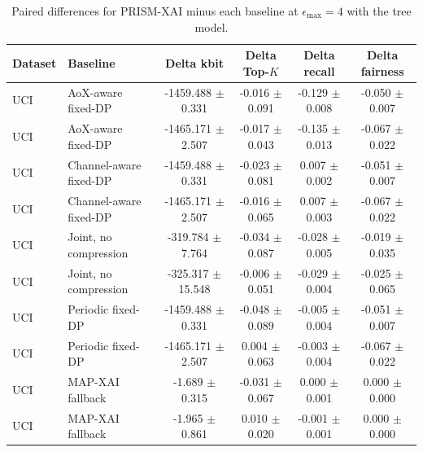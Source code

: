 \begin{table}[t]
\caption{Paired differences for PRISM-XAI minus each baseline at $\epsilon_{\max}=4$ with the tree model.}
\label{tab:paired-differences}
\centering
\scriptsize
\setlength{\tabcolsep}{3pt}
\begin{tabular}{llcccc}
\toprule
Dataset & Baseline & Delta kbit & Delta Top-$K$ & Delta recall & Delta fairness \\
\midrule
UCI & AoX-aware fixed-DP & -1459.488 $\pm$ 0.331 & -0.016 $\pm$ 0.091 & -0.129 $\pm$ 0.008 & -0.050 $\pm$ 0.007 \\
UCI & AoX-aware fixed-DP & -1465.171 $\pm$ 2.507 & -0.017 $\pm$ 0.043 & -0.135 $\pm$ 0.013 & -0.067 $\pm$ 0.022 \\
UCI & Channel-aware fixed-DP & -1459.488 $\pm$ 0.331 & -0.023 $\pm$ 0.081 & 0.007 $\pm$ 0.002 & -0.051 $\pm$ 0.007 \\
UCI & Channel-aware fixed-DP & -1465.171 $\pm$ 2.507 & -0.016 $\pm$ 0.065 & 0.007 $\pm$ 0.003 & -0.067 $\pm$ 0.022 \\
UCI & Joint, no compression & -319.784 $\pm$ 7.764 & -0.034 $\pm$ 0.087 & -0.028 $\pm$ 0.005 & -0.019 $\pm$ 0.035 \\
UCI & Joint, no compression & -325.317 $\pm$ 15.548 & -0.006 $\pm$ 0.051 & -0.029 $\pm$ 0.004 & -0.025 $\pm$ 0.065 \\
UCI & Periodic fixed-DP & -1459.488 $\pm$ 0.331 & -0.048 $\pm$ 0.089 & -0.005 $\pm$ 0.004 & -0.051 $\pm$ 0.007 \\
UCI & Periodic fixed-DP & -1465.171 $\pm$ 2.507 & 0.004 $\pm$ 0.063 & -0.003 $\pm$ 0.004 & -0.067 $\pm$ 0.022 \\
UCI & MAP-XAI fallback & -1.689 $\pm$ 0.315 & -0.031 $\pm$ 0.067 & 0.000 $\pm$ 0.001 & 0.000 $\pm$ 0.000 \\
UCI & MAP-XAI fallback & -1.965 $\pm$ 0.861 & 0.010 $\pm$ 0.020 & -0.001 $\pm$ 0.001 & 0.000 $\pm$ 0.000 \\
\bottomrule
\end{tabular}
\end{table}
